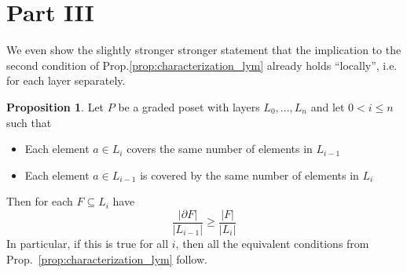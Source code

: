 \documentclass{scrartcl}
\theoremstyle{definition}
\newtheorem{proposition}[definition]{Proposition}
\begin{document}
\section{Part III}
We even show the slightly stronger stronger statement that the implication to the second condition of Prop.\ref{prop:characterization_lym} already holds ``locally'', i.e. for each layer separately.
\begin{proposition}
    Let $P$ be a graded poset with layers $L_0, ..., L_n$ and let $0 < i \leq n$ such that
    \begin{itemize}
        \item Each element $a \in L_i$ covers the same number of elements in $L_{i - 1}$
        \item Each element $a \in L_{i - 1}$ is covered by the same number of elements in $L_i$
    \end{itemize}
    Then for each $F \subseteq L_i$ have
    \begin{equation*}
        \frac {|\partial F|} {|L_{i - 1}|} \geq \frac {|F|} {|L_i|}
    \end{equation*}
    In particular, if this is true for all $i$, then all the equivalent conditions from Prop.~\ref{prop:characterization_lym} follow.
\end{proposition}
\end{document}
